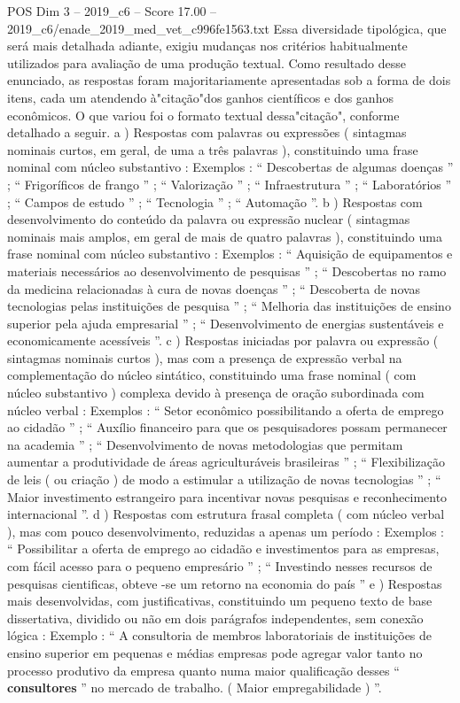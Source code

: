 \begin{textsample}{POS Dim 3 – 2019\_c6 – Score 17.00 – 2019\_c6/enade\_2019\_med\_vet\_c996fe1563.txt}
Essa diversidade tipológica, que será mais detalhada adiante, exigiu mudanças nos critérios habitualmente utilizados para avaliação de uma produção textual.
Como resultado desse enunciado, as respostas foram majoritariamente apresentadas sob a forma de dois itens, cada um atendendo à"citação"dos ganhos científicos e dos ganhos econômicos.
O que variou foi o formato textual dessa"citação", conforme detalhado a seguir. a ) Respostas com palavras ou expressões ( sintagmas nominais curtos, em geral, de uma a três palavras ), constituindo uma frase nominal com núcleo substantivo : Exemplos : “ Descobertas de algumas doenças ” ; “ Frigoríficos de frango ” ; “ Valorização ” ; “ Infraestrutura ” ; “ Laboratórios ” ; “ Campos de estudo ” ; “ Tecnologia ” ; “ Automação ”. b ) Respostas com desenvolvimento do conteúdo da palavra ou expressão nuclear ( sintagmas nominais mais amplos, em geral de mais de quatro palavras ), constituindo uma frase nominal com núcleo substantivo : Exemplos : “ Aquisição de equipamentos e materiais necessários ao desenvolvimento de pesquisas ” ; “ Descobertas no ramo da medicina relacionadas à cura de novas doenças ” ; “ Descoberta de novas tecnologias pelas instituições de pesquisa ” ; “ Melhoria das instituições de ensino superior pela ajuda empresarial ” ; “ Desenvolvimento de energias sustentáveis e economicamente acessíveis ”. c ) Respostas iniciadas por palavra ou expressão ( sintagmas nominais curtos ), mas com a presença de expressão verbal na complementação do núcleo sintático, constituindo uma frase nominal ( com núcleo substantivo ) complexa devido à presença de oração subordinada com núcleo verbal : Exemplos : “ Setor econômico possibilitando a oferta de emprego ao cidadão ” ; “ Auxílio financeiro para que os pesquisadores possam permanecer na academia ” ; “ Desenvolvimento de novas metodologias que permitam aumentar a produtividade de áreas agriculturáveis brasileiras ” ; “ Flexibilização de leis ( ou criação ) de modo a estimular a utilização de novas tecnologias ” ; “ Maior investimento estrangeiro para incentivar novas pesquisas e reconhecimento internacional ”. d ) Respostas com estrutura frasal completa ( com núcleo verbal ), mas com pouco desenvolvimento, reduzidas a apenas um período : Exemplos : “ Possibilitar a oferta de emprego ao cidadão e investimentos para as empresas, com fácil acesso para o pequeno empresário ” ; “ Investindo nesses recursos de pesquisas cientificas, obteve -se um retorno na economia do país ” e ) Respostas mais desenvolvidas, com justificativas, constituindo um pequeno texto de base dissertativa, dividido ou não em dois parágrafos independentes, sem conexão lógica : Exemplo : “ A consultoria de membros laboratoriais de instituições de ensino superior em pequenas e médias empresas pode agregar valor tanto no processo produtivo da empresa quanto numa maior qualificação desses “ \textbf{consultores} ” no mercado de trabalho. ( Maior empregabilidade ) ”.

\end{textsample}
